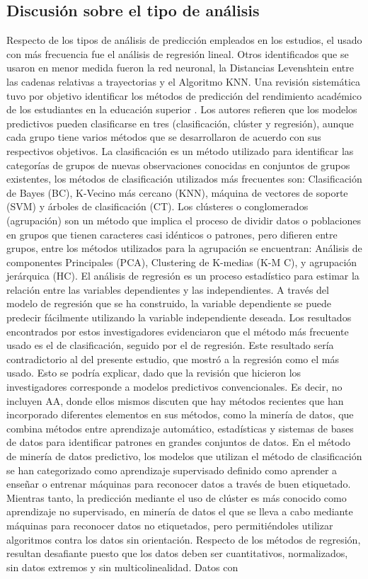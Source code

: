 \documentclass[spanish]{textolivre}
\begin{document}
\subsection*{Discusión sobre el tipo de análisis}
Respecto de los tipos de análisis de predicción empleados en los estudios, el usado con más frecuencia fue el análisis de regresión lineal. Otros identificados que se usaron en menor medida fueron la red neuronal, la Distancias Levenshtein entre las cadenas relativas a trayectorias y el Algoritmo KNN. Una revisión sistemática tuvo por objetivo identificar los métodos de predicción del rendimiento académico de los estudiantes en la educación superior \cite{zulkifli2019}. Los autores refieren que los modelos predictivos pueden clasificarse en tres (clasificación, clúster y regresión), aunque cada grupo tiene varios métodos que se desarrollaron de acuerdo con sus respectivos objetivos. La clasificación es un método utilizado para identificar las categorías de grupos de nuevas observaciones conocidas en conjuntos de grupos existentes, los métodos de clasificación utilizados más frecuentes son: Clasificación de Bayes (BC), K-Vecino más cercano (KNN), máquina de vectores de soporte (SVM) y árboles de clasificación (CT). Los clústeres o conglomerados (agrupación) son un método que implica el proceso de dividir datos o poblaciones en grupos que tienen caracteres casi idénticos o patrones, pero difieren entre grupos, entre los métodos utilizados para la agrupación se encuentran: Análisis de componentes Principales (PCA), Clustering de K-medias (K-M C), y agrupación jerárquica (HC). El análisis de regresión es un proceso estadístico para estimar la relación entre las variables dependientes y las independientes. A través del modelo de regresión que se ha construido, la variable dependiente se puede predecir fácilmente utilizando la variable independiente deseada. Los resultados encontrados por estos investigadores evidenciaron que el método más frecuente usado es el de clasificación, seguido por el de regresión. Este resultado sería contradictorio al del presente estudio, que mostró a la regresión como el más usado. Esto se podría explicar, dado que la revisión que hicieron los investigadores corresponde a modelos predictivos convencionales. Es decir, no incluyen AA, donde ellos mismos discuten que hay métodos recientes que han incorporado diferentes elementos en sus métodos, como la minería de datos, que combina métodos entre aprendizaje automático, estadísticas y sistemas de bases de datos para identificar patrones en grandes conjuntos de datos. En el método de minería de datos predictivo, los modelos que utilizan el método de clasificación se han categorizado como aprendizaje supervisado definido como aprender a enseñar o entrenar máquinas para reconocer datos a través de buen etiquetado. Mientras tanto, la predicción mediante el uso de clúster es más conocido como aprendizaje no supervisado, en minería de datos el que se lleva a cabo mediante máquinas para reconocer datos no etiquetados, pero permitiéndoles utilizar algoritmos contra los datos sin orientación. Respecto de los métodos de regresión, resultan desafiante puesto que los datos deben ser cuantitativos, normalizados, sin datos extremos y sin multicolinealidad. Datos con 
\end{document}
